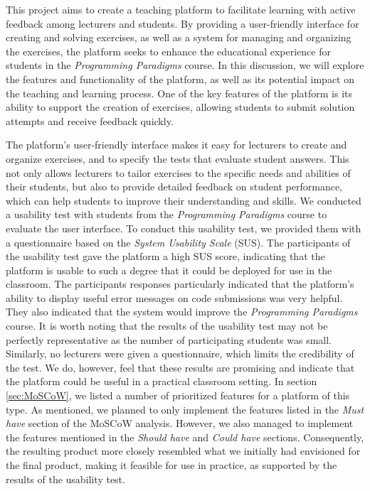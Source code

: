 This project aims to create a teaching platform to facilitate learning with active feedback among lecturers and students.
By providing a user-friendly interface for creating and solving exercises, as well as a system for managing and organizing the exercises, the platform seeks to enhance the educational experience for students in the \textit{Programming Paradigms} course.
In this discussion, we will explore the features and functionality of the platform, as well as its potential impact on the teaching and learning process.
One of the key features of the platform is its ability to support the creation of exercises, allowing students to submit solution attempts and receive feedback quickly.

The platform's user-friendly interface makes it easy for lecturers to create and organize exercises, and to specify the tests that evaluate student answers. This not only allows lecturers to tailor exercises to the specific needs and abilities of their students, but also to provide detailed feedback on student performance, which can help students to improve their understanding and skills.
We conducted a usability test with students from the \textit{Programming Paradigms} course to evaluate the user interface.
To conduct this usability test, we provided them with a questionnaire based on the \textit{System Usability Scale} (SUS).
The participants of the usability test gave the platform a high SUS score, indicating that the platform is usable to such a degree that it could be deployed for use in the classroom. The participants responses particularly indicated that the platform's ability to display useful error messages on code submissions was very helpful.
They also indicated that the system would improve the \textit{Programming Paradigms} course.
It is worth noting that the results of the usability test may not be perfectly representative as the number of participating students was small.
Similarly, no lecturers were given a questionnaire, which limits the credibility of the test.
We do, however, feel that these results are promising and indicate that the platform could be useful in a practical classroom setting.
In section \ref{sec:MoSCoW}, we listed a number of prioritized features for a platform of this type.
As mentioned, we planned to only implement the features listed in the \textit{Must have} section of the MoSCoW analysis.
However, we also managed to implement the features mentioned in the \textit{Should have} and \textit{Could have} sections.
Consequently, the resulting product more closely resembled what we initially had envisioned for the final product, making it feasible for use in practice, as supported by the results of the usability test.


